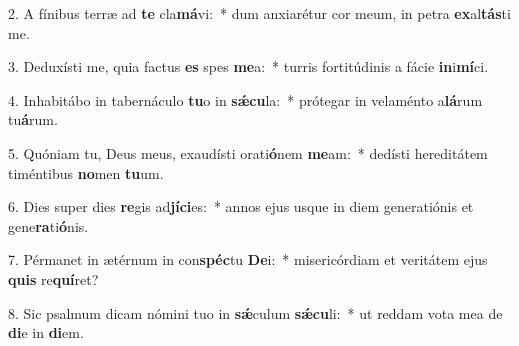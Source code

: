 2. A fínibus terræ ad \textbf{te} cla\textbf{má}vi:~*  dum anxiarétur cor meum, in petra \textbf{ex}al\textbf{tás}ti me.\

3. Deduxísti me, quia factus \textbf{es} spes \textbf{me}a:~*  turris fortitúdinis a fácie \textbf{in}i\textbf{mí}ci.\

4. Inhabitábo in tabernáculo \textbf{tu}o in \textbf{sǽ}\textbf{cu}la:~*  prótegar in velaménto a\textbf{lá}rum tu\textbf{á}rum.\

5. Quóniam tu, Deus meus, exaudísti orati\textbf{ó}nem \textbf{me}am:~*  dedísti hereditátem timéntibus \textbf{no}men \textbf{tu}um.\

6. Dies super dies \textbf{re}gis ad\textbf{jí}\textbf{ci}es:~*  annos ejus usque in diem generatiónis et gene\textbf{ra}ti\textbf{ó}nis.\

7. Pérmanet in ætérnum in con\textbf{spéc}tu \textbf{De}i:~*  misericórdiam et veritátem ejus \textbf{quis} re\textbf{quí}ret?\

8. Sic psalmum dicam nómini tuo in \textbf{sǽ}culum \textbf{sǽ}\textbf{cu}li:~*  ut reddam vota mea de \textbf{di}e in \textbf{di}em.\

